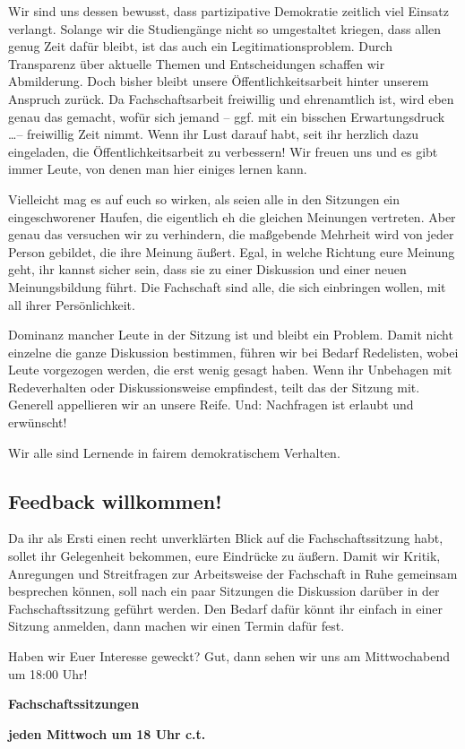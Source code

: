 Wir sind uns dessen bewusst, dass partizipative Demokratie zeitlich viel Einsatz verlangt. Solange wir die Studiengänge nicht so umgestaltet kriegen, dass allen genug Zeit dafür bleibt, ist das auch ein Legitimationsproblem. Durch Transparenz über aktuelle Themen und Entscheidungen schaffen wir Abmilderung. Doch bisher bleibt unsere Öffentlichkeitsarbeit hinter unserem Anspruch zurück. Da Fachschaftsarbeit freiwillig und ehrenamtlich ist, wird eben genau das gemacht, wofür sich jemand -- ggf. mit ein bisschen Erwartungsdruck \dots -- freiwillig Zeit nimmt. Wenn ihr Lust darauf habt, seit ihr herzlich dazu eingeladen, die Öffentlichkeitsarbeit zu verbessern! Wir freuen uns und es gibt immer Leute, von denen man hier einiges lernen kann.

Vielleicht mag es auf euch so wirken, als seien alle in den Sitzungen ein eingeschworener Haufen, die eigentlich eh die gleichen Meinungen vertreten. Aber genau das versuchen wir zu verhindern, die maßgebende Mehrheit wird von jeder Person gebildet, die ihre Meinung äußert. Egal, in welche Richtung eure Meinung geht, ihr kannst sicher sein, dass sie zu einer Diskussion und einer neuen Meinungsbildung führt. Die Fachschaft sind alle, die sich einbringen wollen, mit all ihrer Persönlichkeit.

Dominanz mancher Leute in der Sitzung ist und bleibt ein Problem. Damit nicht einzelne die ganze Diskussion bestimmen, führen wir bei Bedarf Redelisten, wobei Leute vorgezogen werden, die erst wenig gesagt haben. Wenn ihr Unbehagen mit Redeverhalten oder Dis\-kussions\-weise empfindest, teilt das der Sitzung mit. Generell appellieren wir an unsere Reife. Und: Nachfragen ist erlaubt und erwünscht!

Wir alle sind Lernende in fairem demokratischem Verhalten.

\subsection{Feedback willkommen!}
Da ihr als Ersti einen recht unverklärten Blick auf die Fachschaftssitzung habt, sollet ihr Gelegenheit bekommen, eure Eindrücke zu äußern. Damit wir Kritik, Anregungen und Streitfragen zur Arbeitsweise der Fachschaft in Ruhe gemeinsam besprechen können, soll nach ein paar Sitzungen die Diskussion darüber in der Fachschaftssitzung geführt werden. Den Bedarf dafür könnt ihr einfach in einer Sitzung anmelden, dann machen wir einen Termin dafür fest.

Haben wir Euer Interesse geweckt? Gut, dann sehen wir uns am Mittwochabend um 18:00 Uhr!

\begin{center}
    \large
    \textbf{Fachschaftssitzungen}

    \textbf{jeden Mittwoch um 18 Uhr \gls{c.t.}}
\end{center}
